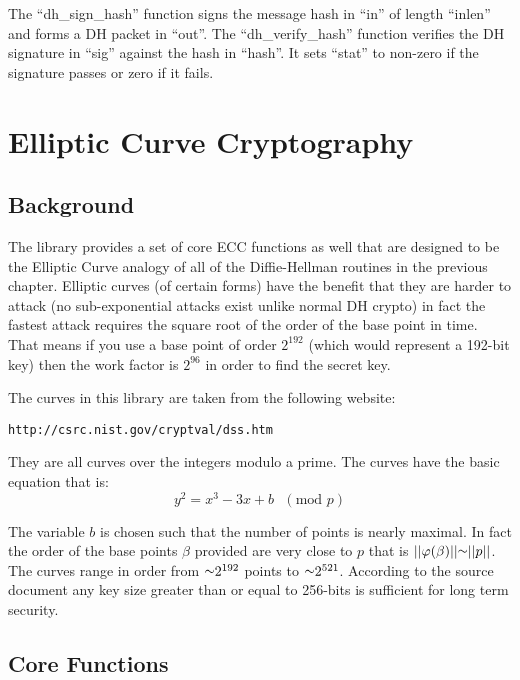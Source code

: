 \documentclass{book}
\def\approx{\raisebox{0.2ex}{\mbox{\small $\sim$}}}
\def\phi{\varphi}
\begin{document}
The ``dh\_sign\_hash'' function signs the message hash in ``in'' of length ``inlen'' and forms a DH packet in ``out''.  
The ``dh\_verify\_hash'' function verifies the DH signature in ``sig'' against the hash in ``hash''.  It sets ``stat''
to non-zero if the signature passes or zero if it fails.

\chapter{Elliptic Curve Cryptography}

\section{Background}
The library provides a set of core ECC functions as well that are designed to be the Elliptic Curve analogy of all of the 
Diffie-Hellman routines in the previous chapter.  Elliptic curves (of certain forms) have the benefit that they are harder
to attack (no sub-exponential attacks exist unlike normal DH crypto) in fact the fastest attack requires the square root
of the order of the base point in time.  That means if you use a base point of order $2^{192}$ (which would represent a
192-bit key) then the work factor is $2^{96}$ in order to find the secret key.

The curves in this library are taken from the following website:
\begin{verbatim}
http://csrc.nist.gov/cryptval/dss.htm
\end{verbatim}

They are all curves over the integers modulo a prime.  The curves have the basic equation that is:
\begin{equation}
y^2 = x^3 - 3x + b\mbox{ }(\mbox{mod }p)
\end{equation}

The variable $b$ is chosen such that the number of points is nearly maximal.  In fact the order of the base points $\beta$ 
provided are very close to $p$ that is $\vert \vert \phi(\beta) \vert \vert \approx \vert \vert p \vert \vert$.  The curves
range in order from $\approx 2^{192}$ points to $\approx 2^{521}$.  According to the source document any key size greater
than or equal to 256-bits is sufficient for long term security.  

\section{Core Functions}
\end{document}
